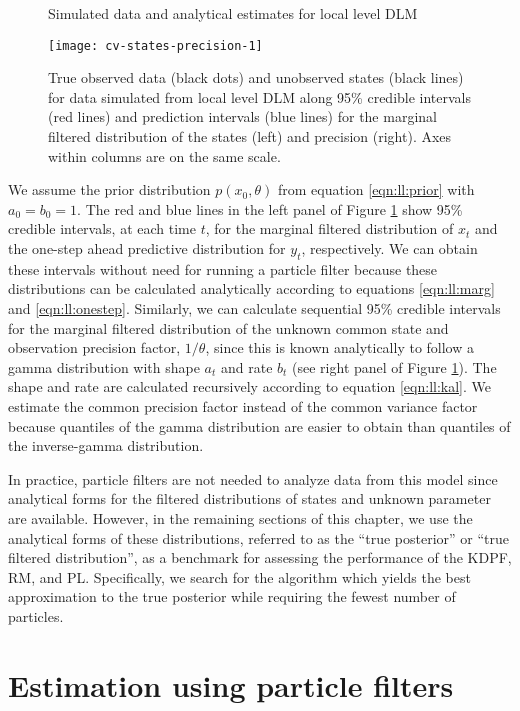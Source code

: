 \begin{figure}[ht]
\ssp
\centering
\caption{Simulated data and analytical estimates for local level DLM} \label{fig:comp:data}
\texttt{[image: cv-states-precision-1]}
\caption*{True observed data (black dots) and unobserved states (black lines) for data simulated from local level DLM along 95\% credible intervals (red lines) and prediction intervals (blue lines) for the marginal filtered distribution of the states (left) and precision (right). Axes within columns are on the same scale.}
\end{figure}

We assume the prior distribution $p(x_0,\theta)$ from equation \eqref{eqn:ll:prior} with $a_0 = b_0 = 1$. The red and blue lines in the left panel of Figure \ref{fig:comp:data} show 95\% credible intervals, at each time $t$, for the marginal filtered distribution of $x_t$ and the one-step ahead predictive distribution for $y_t$, respectively. We can obtain these intervals without need for running a particle filter because these distributions can be calculated analytically according to equations \eqref{eqn:ll:marg} and \eqref{eqn:ll:onestep}. Similarly, we can calculate sequential 95\% credible intervals for the marginal filtered distribution of the unknown common state and observation precision factor, $1/\theta$, since this is known analytically to follow a gamma distribution with shape $a_t$ and rate $b_t$  (see right panel of Figure \ref{fig:comp:data}). The shape and rate are calculated recursively according to equation \eqref{eqn:ll:kal}. We estimate the common precision factor instead of the common variance factor because quantiles of the gamma distribution are easier to obtain than quantiles of the inverse-gamma distribution.

In practice, particle filters are not needed to analyze data from this model since analytical forms for the filtered distributions of states and unknown parameter are available. However, in the remaining sections of this chapter, we use the analytical forms of these distributions, referred to as the ``true posterior'' or ``true filtered distribution'', as a benchmark for assessing the performance of the KDPF, RM, and PL. Specifically, we search for the algorithm which yields the best approximation to the true posterior while requiring the fewest number of particles.

\section{Estimation using particle filters} \label{sec:comp:est}

